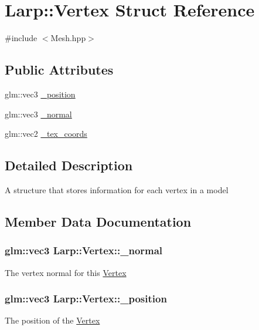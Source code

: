 \hypertarget{structLarp_1_1Vertex}{}\section{Larp\+:\+:Vertex Struct Reference}
\label{structLarp_1_1Vertex}


{\ttfamily \#include $<$Mesh.\+hpp$>$}

\subsection*{Public Attributes}
\begin{DoxyCompactItemize}
\item 
glm\+::vec3 \hyperlink{structLarp_1_1Vertex_a271f825c3a02f11e49a16f2432f62765}{\+\_\+position}
\item 
glm\+::vec3 \hyperlink{structLarp_1_1Vertex_aefb3ec6fe143142c52dd48353c391b27}{\+\_\+normal}
\item 
glm\+::vec2 \hyperlink{structLarp_1_1Vertex_aa3c59b04ad38f2861683c2784bc137fd}{\+\_\+tex\+\_\+coords}
\end{DoxyCompactItemize}


\subsection{Detailed Description}
A structure that stores information for each vertex in a model 

\subsection{Member Data Documentation}
\subsubsection[{\texorpdfstring{\+\_\+normal}{_normal}}]{\setlength{\rightskip}{0pt plus 5cm}glm\+::vec3 Larp\+::\+Vertex\+::\+\_\+normal}\hypertarget{structLarp_1_1Vertex_aefb3ec6fe143142c52dd48353c391b27}{}\label{structLarp_1_1Vertex_aefb3ec6fe143142c52dd48353c391b27}
The vertex normal for this \hyperlink{structLarp_1_1Vertex}{Vertex} 
\subsubsection[{\texorpdfstring{\+\_\+position}{_position}}]{\setlength{\rightskip}{0pt plus 5cm}glm\+::vec3 Larp\+::\+Vertex\+::\+\_\+position}\hypertarget{structLarp_1_1Vertex_a271f825c3a02f11e49a16f2432f62765}{}\label{structLarp_1_1Vertex_a271f825c3a02f11e49a16f2432f62765}
The position of the \hyperlink{structLarp_1_1Vertex}{Vertex} 
